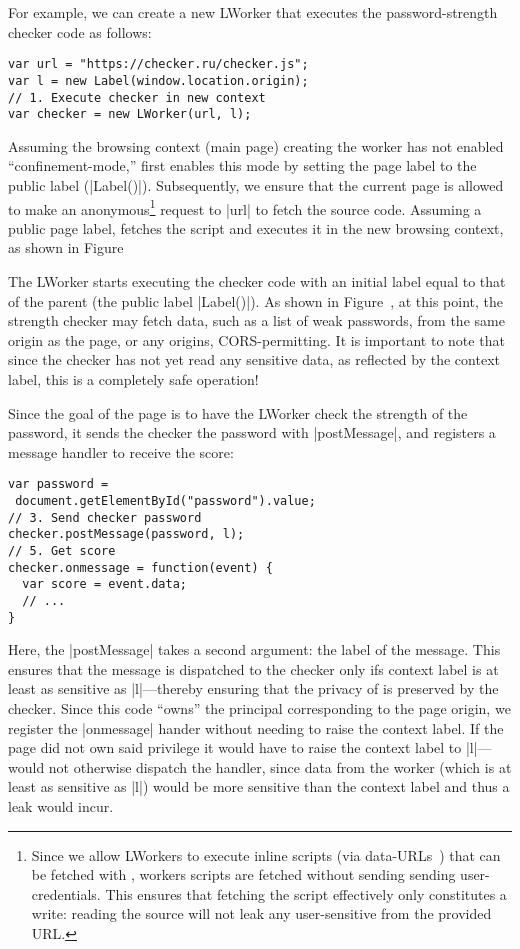 For example, we can create a new LWorker that executes the
password-strength checker code as follows:
\begin{lstlisting}
var url = "https://checker.ru/checker.js";
var l = new Label(window.location.origin);
// 1. Execute checker in new context
var checker = new LWorker(url, l);
\end{lstlisting}
%
Assuming the browsing context (main page) creating the worker has not
enabled ``confinement-mode,'' \sys{} first enables this mode by
setting the page label to the public label (\js|Label()|).
%
Subsequently, we ensure that the current page is allowed to make an
anonymous\footnote{
  Since we allow LWorkers to execute inline scripts (via
  data-URLs~) that can be fetched with \xhr{}, workers
  scripts are fetched without sending sending user-credentials.
  This ensures that fetching the script effectively only constitutes a
  write: reading the source will not leak any user-sensitive from the
  provided URL.
} request to \js|url| to fetch the source code.
%
Assuming a public page label, \sys{} fetches the script and executes
it in the new browsing context, as shown in
Figure~

The LWorker starts executing the checker code with an initial label
equal to that of the parent (the public label \js|Label()|).
%
As shown in Figure~, at this point, the strength
checker may fetch data, such as a list of weak passwords, from the
same origin as the page, or any origins, CORS-permitting.
%
It is important to note that since the checker has not yet read any
sensitive data, as reflected by the context label, this is a
completely safe operation!

Since the goal of the page is to have the LWorker check the strength
of the password, it sends the checker the password with
\js|postMessage|, and registers a message handler to receive the
score:
\begin{lstlisting}
var password = 
 document.getElementById("password").value;
// 3. Send checker password 
checker.postMessage(password, l);
// 5. Get score
checker.onmessage = function(event) {
  var score = event.data; 
  // ...
}
\end{lstlisting}
Here, the \js|postMessage| takes a second argument: the label of the
message.
%
This ensures that the message is dispatched to the checker only ifs
context label is at least as sensitive as \js|l|---thereby ensuring
that the privacy of  is preserved by the checker.
%
Since this code ``owns'' the principal corresponding to the page
origin, we register the \js|onmessage| hander without needing to raise
the context label. If the page did not own said privilege it would
have to raise the context label to \js|l|---\sys{} would not otherwise
dispatch the handler, since data from the worker (which is at least as
sensitive as \js|l|) would be more sensitive than the context label
and thus a leak would incur.

